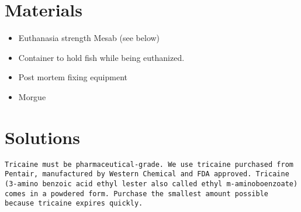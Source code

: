 \documentclass[
  letterpaper,
  DIV=11,
  numbers=noendperiod]{scrreprt}
\providecommand{\tightlist}{%
  \setlength{\itemsep}{0pt}\setlength{\parskip}{0pt}}\usepackage{longtable,booktabs,array}
\begin{document}
\hypertarget{materials-36}{%
\section{Materials}\label{materials-36}}

\begin{itemize}
\tightlist
\item
  Euthanasia strength Mesab (see below)
\item
  Container to hold fish while being euthanized.
\item
  Post mortem fixing equipment
\item
  Morgue
\end{itemize}

\hypertarget{solutions-28}{%
\section{Solutions}\label{solutions-28}}

\begin{tcolorbox}[enhanced jigsaw, toprule=.15mm, breakable, coltitle=black, leftrule=.75mm, title=\textcolor{quarto-callout-warning-color}{\faExclamationTriangle}\hspace{0.5em}{NOTES}, bottomrule=.15mm, toptitle=1mm, bottomtitle=1mm, colframe=quarto-callout-warning-color-frame, opacityback=0, colback=white, opacitybacktitle=0.6, colbacktitle=quarto-callout-warning-color!10!white, rightrule=.15mm, titlerule=0mm, arc=.35mm, left=2mm]

\begin{verbatim}
Tricaine must be pharmaceutical-grade. We use tricaine purchased from Pentair, manufactured by Western Chemical and FDA approved. Tricaine (3-amino benzoic acid ethyl lester also called ethyl m-aminoboenzoate) comes in a powdered form. Purchase the smallest amount possible because tricaine expires quickly.
\end{verbatim}

\end{tcolorbox}
\end{document}

